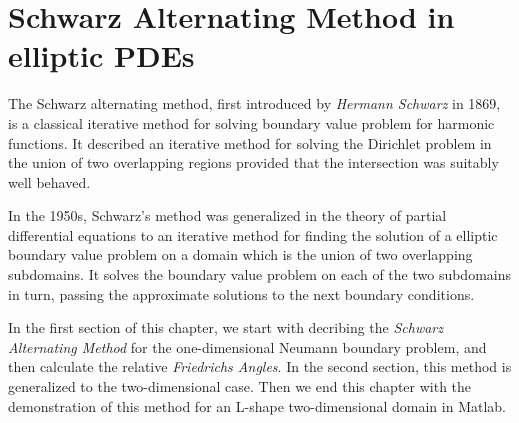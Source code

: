 \chapter{Schwarz Alternating Method in elliptic PDEs}\label{chapt:SAM}
The Schwarz alternating method, first introduced by \emph{Hermann Schwarz}\cite{HS69} in 1869, is a classical iterative method for solving boundary value problem for harmonic functions. It described an iterative method for solving the Dirichlet problem in the union of two overlapping regions provided that the intersection was suitably well behaved.

In the 1950s, Schwarz's method was generalized in the theory of partial differential equations to an iterative method for finding the solution of a elliptic boundary value problem on a domain which is the union of two overlapping subdomains.  It solves the boundary value problem on each of the two subdomains in turn, passing the approximate solutions to the next boundary conditions. 

In the first section of this chapter, we start with decribing the \emph{Schwarz Alternating Method} for the one-dimensional Neumann boundary problem, and then calculate the relative \emph{Friedrichs Angles}. In the second section, this method is generalized to the two-dimensional case. Then we end this chapter with the demonstration of this method for an L-shape two-dimensional domain in Matlab.

